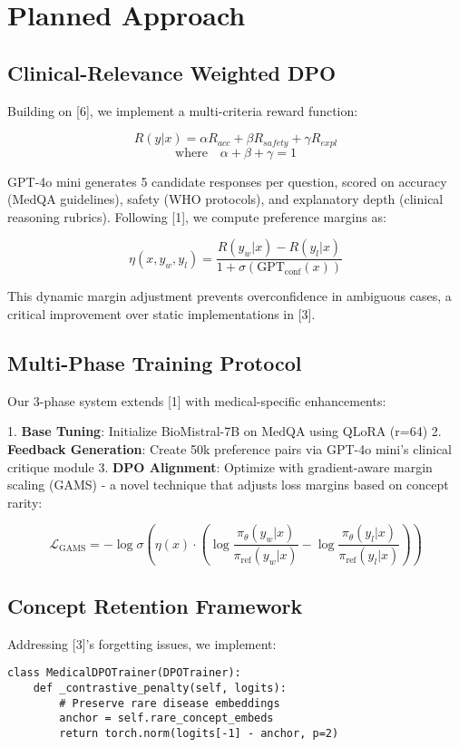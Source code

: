 \documentclass[11pt,a4paper]{article}
\begin{document}
\section{Planned Approach}
\subsection{Clinical-Relevance Weighted DPO}
Building on [6], we implement a multi-criteria reward function:

\[
R(y|x) = \alpha R_{acc} + \beta R_{safety} + \gamma R_{expl} 
\]
\[
\text{where} \quad \alpha+\beta+\gamma=1
\]

GPT-4o mini generates 5 candidate responses per question, scored on accuracy (MedQA guidelines), safety (WHO protocols), and explanatory depth (clinical reasoning rubrics). Following [1], we compute preference margins as:

\[
\eta(x,y_w,y_l) = \frac{R(y_w|x) - R(y_l|x)}{1 + \sigma(\text{GPT}_{\text{conf}}(x))}
\]

This dynamic margin adjustment prevents overconfidence in ambiguous cases, a critical improvement over static implementations in [3].

\subsection{Multi-Phase Training Protocol}
Our 3-phase system extends [1] with medical-specific enhancements:

1. \textbf{Base Tuning}: Initialize BioMistral-7B on MedQA using QLoRA (r=64)
2. \textbf{Feedback Generation}: Create 50k preference pairs via GPT-4o mini's clinical critique module
3. \textbf{DPO Alignment}: Optimize with gradient-aware margin scaling (GAMS) - a novel technique that adjusts loss margins based on concept rarity:

\[
\mathcal{L}_{\text{GAMS}} = -\log\sigma\left(\eta(x) \cdot (\log\frac{\pi_\theta(y_w|x)}{\pi_{\text{ref}}(y_w|x)} - \log\frac{\pi_\theta(y_l|x)}{\pi_{\text{ref}}(y_l|x)})\right)
\]

\subsection{Concept Retention Framework}
Addressing [3]'s forgetting issues, we implement:

\begin{verbatim}
class MedicalDPOTrainer(DPOTrainer):
    def _contrastive_penalty(self, logits):
        # Preserve rare disease embeddings
        anchor = self.rare_concept_embeds 
        return torch.norm(logits[-1] - anchor, p=2) 
\end{verbatim}
\end{document}
